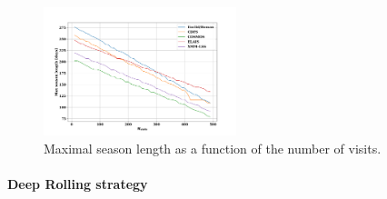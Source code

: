 \documentclass[skiphelvet,twocolumn]{aastex63}
\begin{document}
\begin{figure}[htbp]
\begin{center}
  \includegraphics[width=0.5\textwidth]{seasonlength_nvisits.png}
 \caption{Maximal season length as a function of the number of visits.}\label{fig:seasonlength_nvisits}
\end{center}
\end{figure}

\paragraph{Deep Rolling strategy}
\end{document}
